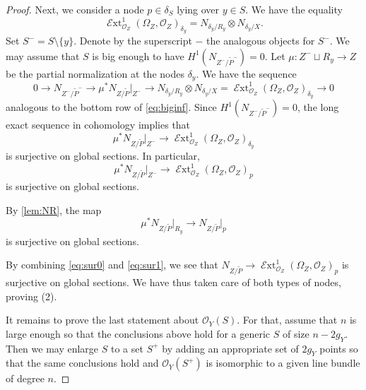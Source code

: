 \documentclass[11 pt]{amsart}
\renewcommand{\O}{{\mathcal O}}
\DeclareMathOperator{\shExt}{\mathscr{E}xt}
\providecommand {\from}{{\colon}}
\numberwithin{equation}{section}
\begin{document}
\begin{proof}
  Next, we consider a node $p \in \delta_S$ lying over $y \in S$.
  We have the equality
  \[ \shExt^1_{\O_Z}(\Omega_Z, \O_Z)_{\delta_y} = N_{\delta_y/R_y}\otimes N_{\delta_y/X}.\]
  Set $S^- = S \setminus \{y\}$.
  Denote by the superscript $-$ the analogous objects for $S^-$.
  We may assume that $S$ is big enough to have $H^1(N_{Z^-/\widetilde{P}^-}) = 0$.
  Let $\mu \from Z^- \sqcup R_y \to Z$ be the partial normalization at the nodes $\delta_y$.
  We have the sequence
  \[ 0 \to N_{Z^-/\widetilde{P}^-} \to \mu^* N_{Z/\widetilde{P}}\big|_{Z^-} \to  N_{\delta_y/R_y}\otimes N_{\delta_y/X} = \shExt^1_{\O_Z}(\Omega_Z, \O_Z)_{\delta_y} \to 0\]
  analogous to the bottom row of \eqref{eq:biginf}.
  Since $H^1(N_{Z^-/\widetilde{P}^-}) = 0$, the long exact sequence in cohomology implies that
  \[ \mu^* N_{Z/\widetilde{P}}\big|_{Z^-} \to \shExt^1_{\O_Z}(\Omega_Z, \O_Z)_{\delta_y}\]
  is surjective on global sections.
  In particular,
  \begin{equation}\label{eq:sur0}
    \mu^* N_{Z/\widetilde{P}}\big|_{Z^-} \to \shExt^1_{\O_Z}(\Omega_Z, \O_Z)_{p}
  \end{equation}
  is surjective on global sections.
  
  By \autoref{lem:NR}, the map
  \begin{equation}\label{eq:sur1}
    \mu^* N_{Z/\widetilde{P}}\big|_{R_y} \to N_{Z/\widetilde{P}}\big|_p
  \end{equation}
  is surjective on global sections.

  By combining \eqref{eq:sur0} and \eqref{eq:sur1}, we see that $N_{Z/\widetilde{P}} \to \shExt^1_{\O_Z}(\Omega_Z,\O_Z)_p$ is surjective on global sections.
  We have thus taken care of both types of nodes, proving (2).
  
  It remains to prove the last statement about $\O_Y(S)$.
  For that, assume that $n$ is large enough so that the conclusions above hold for a generic $S$ of size $n - 2g_Y$.
  Then we may enlarge $S$ to a set $S^+$ by adding an appropriate set of $2g_Y$ points so that the same conclusions hold and $\O_Y(S^+)$ is isomorphic to a given line bundle of degree $n$.
\end{proof}
\end{document}

